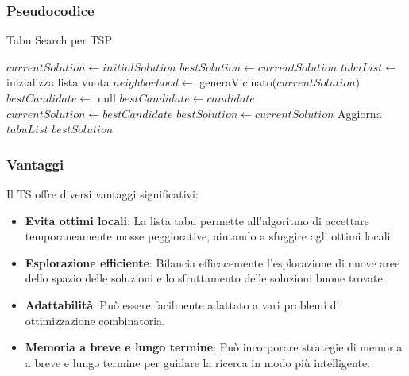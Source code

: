 \subsubsection{Pseudocodice}


\begin{algorithm}
	\caption{Tabu Search per \Gls{TSP}}\label{alg:tabusearch}
	\begin{algorithmic}[1]
		\State $currentSolution \gets initialSolution$
		\State $bestSolution \gets currentSolution$
		\State $tabuList \gets$ inizializza lista vuota
		\State $neighborhood \gets$ generaVicinato($currentSolution$)
		\State $bestCandidate \gets$ null
		\State $bestCandidate \gets candidate$
		\EndIf
		\EndFor
		\State $currentSolution \gets bestCandidate$
		\State $bestSolution \gets currentSolution$
		\EndIf
		\State Aggiorna $tabuList$
		\EndFor
		\State \Return $bestSolution$
		\EndProcedure
	\end{algorithmic}
\end{algorithm}

\subsubsection{Vantaggi}

Il \Gls{TS} offre diversi vantaggi significativi:

\begin{itemize}
	\item \textbf{Evita ottimi locali}: La lista tabu permette all'algoritmo di accettare temporaneamente mosse peggiorative, aiutando a sfuggire agli ottimi locali.
	\item \textbf{Esplorazione efficiente}: Bilancia efficacemente l'esplorazione di nuove aree dello spazio delle soluzioni e lo sfruttamento delle soluzioni buone trovate.
	\item \textbf{Adattabilità}: Può essere facilmente adattato a vari problemi di ottimizzazione combinatoria.
	\item \textbf{Memoria a breve e lungo termine}: Può incorporare strategie di memoria a breve e lungo termine per guidare la ricerca in modo più intelligente.
\end{itemize}

